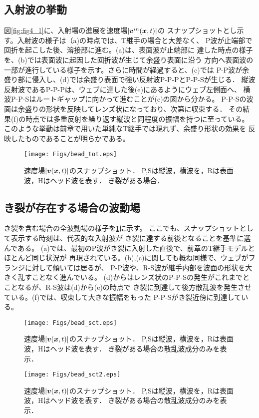 \subsection{入射波の挙動}
図\ref{fig:fig4_1}に、入射場の進展を速度場$|\mbox{\boldmath $v$}^{in}(\mbox{\boldmath $x$},t)|$の
スナップショットとし示す。入射波の様子は（a)の時点では、T継手の場合と大差なく、
P波が止端部で回折を起こした後、溶接部に進む。(a)は、表面波が止端部に
達した時点の様子を、(b)では表面波に起因した回折波が生じて余盛り表面に沿う
方向へ表面波の一部が進行している様子を示す。さらに時間が経過すると、(c)では
P-P波が余盛り部に侵入し、(d)では余盛り表面で強い反射波P-P-PとP-P-Sが生じる．
縦波反射波であるP-P-Pは、ウェブに達した後(e)にあるようにウェブ左側面へ、
横波P-P-Sはルートギャップに向かって進むことが(e)の図から分かる。
P-P-Sの波面は余盛りの形状を反映してレンズ状になっており、次第に収束する．
その結果(f)の時点では多重反射を繰り返す縦波と同程度の振幅を持つに至っている。
このような挙動は前章で用いた単純なT継手では現れず、余盛り形状の効果を
反映したものであることが明らかである。
\begin{figure}[h]
	\begin{center}
	\texttt{[image: Figs/bead\_tot.eps]} 
	\end{center}
	\caption{
		速度場$|\mbox{\boldmath $v$}(\mbox{\boldmath $x$},t)|$のスナップショット．
		P,Sは縦波，横波を，Rは表面波，Hはヘッド波を表す．
		き裂がある場合．
	} 
	\label{fig:fig4_2}
\end{figure}
\subsection{き裂が存在する場合の波動場}
き裂を含む場合の全波動場の様子を\ref{fig:fig4_2}に示す。
ここでも、スナップショットとして表示する時刻は、代表的な入射波が
き裂に達する前後となることを基準に選んである。
(a)では、最初のP波がき裂に入射した直後で、前章のT継手モデルとほとんど同じ状況が
再現されている。(b),(c)に関しても概ね同様で、ウェブがフランジに対して傾いては居るが、
P-P波や、R-S波が継手内部を波面の形状を大きく乱すことなく進んでいる。
(d)からはレンズ状のP-P-Sの発生がこれまでとことなるが、R-S波は(d)から(e)の時点で
き裂に到達して後方散乱波を発生させている。(f)では、収束して大きな振幅をもった
P-P-Sがき裂近傍に到達している。
\begin{figure}[h]
	\begin{center}
	\texttt{[image: Figs/bead\_sct.eps]} 
	\end{center}
	\caption{
		速度場$|\mbox{\boldmath $v$}(\mbox{\boldmath $x$},t)|$のスナップショット．
		P,Sは縦波，横波を，Rは表面波，Hはヘッド波を表す．
		き裂がある場合の散乱波成分のみを表示．
	} 
	\label{fig:fig4_3}
\end{figure}
\begin{figure}[h]
	\begin{center}
	\texttt{[image: Figs/bead\_sct2.eps]} 
	\end{center}
	\caption{
		速度場$|\mbox{\boldmath $v$}(\mbox{\boldmath $x$},t)|$のスナップショット．
		P,Sは縦波，横波を，Rは表面波，Hはヘッド波を表す．
		き裂がある場合の散乱波成分のみを表示．
	} 
	\label{fig:fig4_4}
\end{figure}
